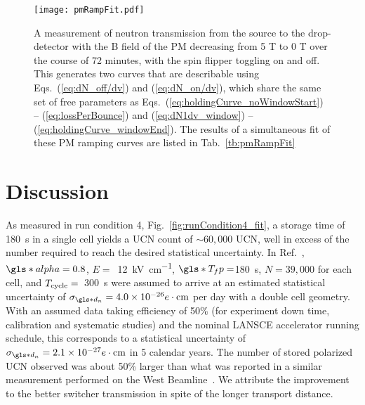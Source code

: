 \begin{figure}[htp]
    \centering
    \texttt{[image: pmRampFit.pdf]}
    \caption[A measurement of neutron transmission from the source to the drop-detector with the B field of the PM decreasing from 5 T to 0 T over the course of 72 minutes, with the spin flipper toggling on and off.]{A measurement of neutron transmission from the source to the drop-detector with the B field of the PM decreasing from 5 T to 0 T over the course of 72 minutes, with the spin flipper toggling on and off. This generates two curves that are describable using Eqs.~(\ref{eq:dN_off/dv}) and (\ref{eq:dN_on/dv}), which share the same set of free parameters as Eqs.~(\ref{eq:holdingCurve_noWindowStart}) -- (\ref{eq:lossPerBounce}) and  (\ref{eq:dN1dv_window}) -- (\ref{eq:holdingCurve_windowEnd}). The results of a simultaneous fit of these PM ramping curves are listed in Tab.~\ref{tb:pmRampFit}}
    \label{fig:pmRampFit}
\end{figure}


\section{\label{sec:discussion}Discussion}


As measured in run condition 4, Fig.~\ref{fig:runCondition4_fit}, a storage time of \qty{180}{\s} in a single cell yields a UCN count of $\sim60,000$ UCN, well in excess of the number required to reach the desired statistical uncertainty. In Ref.~\cite{ito_performance_2018}, $\gls*{alpha}=0.8$, $E=$~\qty{12}{\kilo\volt\per\cm}, $\gls*{T_fp}=$\qty{180}{\s}, $N=39,000$ for each cell, and $T_{\rm cycle} =$~\qty{300}{\s} were assumed to arrive at an estimated statistical uncertainty of $\sigma_{\gls*{d_n}}=4.0\times 10^{-26}e\cdot\text{cm}$ per day with a double cell geometry. With an assumed data taking efficiency of 50\% (for experiment down time, calibration and systematic studies) and the nominal LANSCE accelerator running schedule, this corresponds to a statistical uncertainty of $\sigma_{\gls*{d_n}}=2.1\times 10^{-27}e\cdot\text{cm}$ in 5 calendar years. The number of stored polarized UCN observed was about 50\% larger than what was reported in a similar measurement performed on the West Beamline~\cite{ito_performance_2018}. We attribute the improvement to the better switcher transmission in spite of the longer transport distance. 

